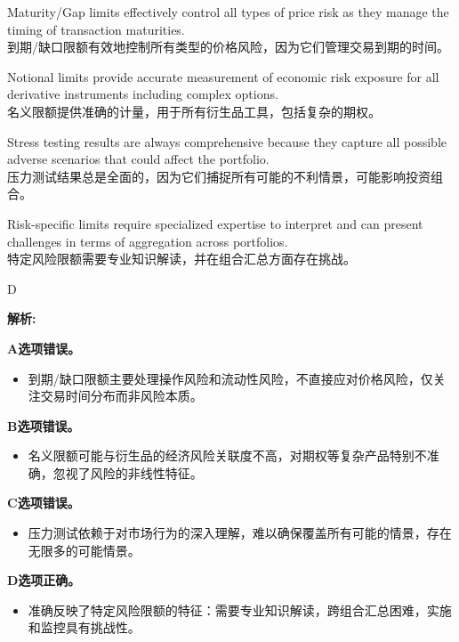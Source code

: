 \documentclass{article}
\newenvironment{explanation}
{\textbf{解析:}\par}
{\par}
\begin{document}
        \begin{choices}
        \item Maturity/Gap limits effectively control all types of price risk as they manage the timing of transaction maturities. \\
        到期/缺口限额有效地控制所有类型的价格风险，因为它们管理交易到期的时间。
        
        \item Notional limits provide accurate measurement of economic risk exposure for all derivative instruments including complex options. \\
        名义限额提供准确的计量，用于所有衍生品工具，包括复杂的期权。
        
        \item Stress testing results are always comprehensive because they capture all possible adverse scenarios that could affect the portfolio. \\
        压力测试结果总是全面的，因为它们捕捉所有可能的不利情景，可能影响投资组合。
        
        \item Risk-specific limits require specialized expertise to interpret and can present challenges in terms of aggregation across portfolios. \\
        特定风险限额需要专业知识解读，并在组合汇总方面存在挑战。
        \end{choices}
        
        \begin{correctanswer}
        D
        \end{correctanswer}
        
        \begin{explanation}
        \textbf{A选项错误。}
        \begin{itemize}
            \item 到期/缺口限额主要处理操作风险和流动性风险，不直接应对价格风险，仅关注交易时间分布而非风险本质。
        \end{itemize}
        
        \textbf{B选项错误。}
        \begin{itemize}
            \item 名义限额可能与衍生品的经济风险关联度不高，对期权等复杂产品特别不准确，忽视了风险的非线性特征。
        \end{itemize}
        
        \textbf{C选项错误。}
        \begin{itemize}
            \item 压力测试依赖于对市场行为的深入理解，难以确保覆盖所有可能的情景，存在无限多的可能情景。
        \end{itemize}
        
        \textbf{D选项正确。}
        \begin{itemize}
            \item 准确反映了特定风险限额的特征：需要专业知识解读，跨组合汇总困难，实施和监控具有挑战性。
        \end{itemize}
        \end{explanation}
\end{document}
